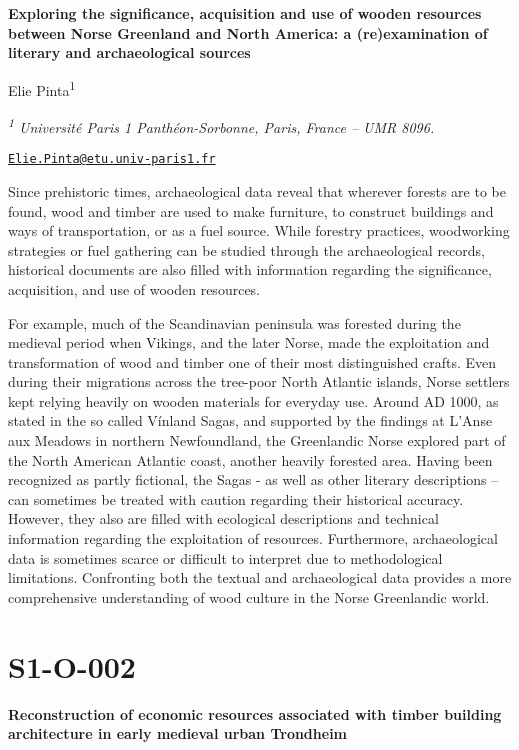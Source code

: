 \documentclass[
]{book}
\begin{document}
\textbf{Exploring the significance, acquisition and use of wooden resources between Norse Greenland and North America: a (re)examination of literary and archaeological sources}

Elie Pinta\textsuperscript{1}

\emph{\textsuperscript{1} Université Paris 1 Panthéon-Sorbonne, Paris, France -- UMR 8096.}

\href{mailto:Elie.Pinta@etu.univ-paris1.fr}{\nolinkurl{Elie.Pinta@etu.univ-paris1.fr}}

Since prehistoric times, archaeological data reveal that wherever forests are to be found, wood and timber are used to make furniture, to construct buildings and ways of transportation, or as a fuel source. While forestry practices, woodworking strategies or fuel gathering can be studied through the archaeological records, historical documents are also filled with information regarding the significance, acquisition, and use of wooden resources.

For example, much of the Scandinavian peninsula was forested during the medieval period when Vikings, and the later Norse, made the exploitation and transformation of wood and timber one of their most distinguished crafts. Even during their migrations across the tree-poor North Atlantic islands, Norse settlers kept relying heavily on wooden materials for everyday use. Around AD 1000, as stated in the so called Vínland Sagas, and supported by the findings at L'Anse aux Meadows in northern Newfoundland, the Greenlandic Norse explored part of the North American Atlantic coast, another heavily forested area. Having been recognized as partly fictional, the Sagas - as well as other literary descriptions -- can sometimes be treated with caution regarding their historical accuracy. However, they also are filled with ecological descriptions and technical information regarding the exploitation of resources. Furthermore, archaeological data is sometimes scarce or difficult to interpret due to methodological limitations. Confronting both the textual and archaeological data provides a more comprehensive understanding of wood culture in the Norse Greenlandic world.

\hypertarget{s1-o-002}{%
\section*{S1-O-002}\label{s1-o-002}}

\textbf{Reconstruction of economic resources associated with timber building architecture in early medieval urban Trondheim}
\end{document}
